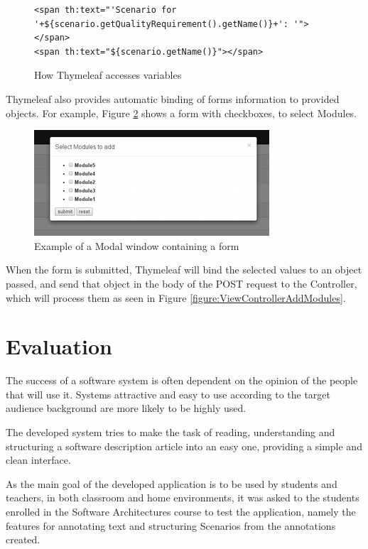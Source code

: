 \documentclass{llncs}
\begin{document}
\begin{figure}
\lstset{style=customhtml}
\begin{lstlisting}
<span th:text="'Scenario for '+${scenario.getQualityRequirement().getName()}+': '">
</span> 
<span th:text="${scenario.getName()}"></span>
\end{lstlisting}
\caption{How Thymeleaf accesses variables}
\label{figure:viewsCallingMethods}
\end{figure}

Thymeleaf also provides automatic binding of forms information to provided objects. For example, Figure \ref{figure:viewsModalFormExample} shows a form with checkboxes, to select Modules.
\begin{figure}
\centering
\includegraphics{images/modalExample}
\caption{Example of a Modal window containing a form}
\label{figure:viewsModalFormExample}
\end{figure}

When the form is submitted, Thymeleaf will bind the selected values to an object passed, and send that object in the body of the POST request to the Controller, which will process them as seen in Figure \ref{figure:ViewControllerAddModules}.

\section{Evaluation}
\label{evaluation}

The success of a software system is often dependent on the opinion of the people that will use it. Systems attractive and easy to use according to the target audience background are more likely to be highly used.

The developed system tries to make the task of reading, understanding and structuring a software description article into an easy one, providing a simple and clean interface.

As the main goal of the developed application is to be used by students and teachers, in both classroom and home environments, it was asked to the students enrolled in the Software Architectures course to test the application, namely the features for annotating text and structuring Scenarios from the annotations created.
\end{document}
